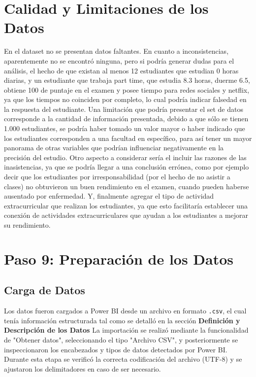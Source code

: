 \documentclass[12pt,letterpaper]{report}
\begin{document}
\section{Calidad y Limitaciones de los Datos}
En el dataset no se presentan datos faltantes. En cuanto a inconsistencias, aparentemente no se encontró ninguna, pero si podría generar dudas para el análisis, el hecho de que existan al menos 12 estudiantes que estudian 0 horas diarias, y un estudiante que trabaja part time, que estudia 8.3 horas, duerme 6.5, obtiene 100 de puntaje en el examen y posee tiempo para redes sociales y netflix, ya que los tiempos no coinciden por completo, lo cual podría indicar falsedad en la respuesta del estudiante.
Una limitación que podría presentar el set de datos corresponde a la cantidad de información presentada, debido a que sólo se tienen 1.000 estudiantes, se podría haber tomado un valor mayor o haber indicado que los estudiantes corresponden a una facultad en específico, para así tener un mayor panorama de otras variables que podrían influenciar negativamente en la precisión del estudio. Otro aspecto a considerar sería el incluir las razones de las inasistencias, ya que se podría llegar a una conclusión errónea, como por ejemplo decir que los estudiantes por irresponsabilidad (por el hecho de no asistir a clases) no obtuvieron un buen rendimiento en el examen, cuando pueden haberse ausentado por enfermedad. Y,
finalmente agregar el tipo de actividad extracurricular que realizan los estudiantes, ya que esto facilitaría establecer una conexión de actividades extracurriculares que ayudan a los estudiantes a mejorar su rendimiento.

\section{Paso 9: Preparación de los Datos}

\subsection{Carga de Datos}
Los datos fueron cargados a Power BI desde un archivo en formato \texttt{.csv}, el cual tenía información estructurada tal como se detalló en la sección \textbf{Definición y Descripción de los Datos} La importación se realizó mediante la funcionalidad de "Obtener datos", seleccionando el tipo "Archivo CSV", y posteriormente se inspeccionaron los encabezados y tipos de datos detectados por Power BI. Durante esta etapa se verificó la correcta codificación del archivo (UTF-8) y se ajustaron los delimitadores en caso de ser necesario.
\end{document}
